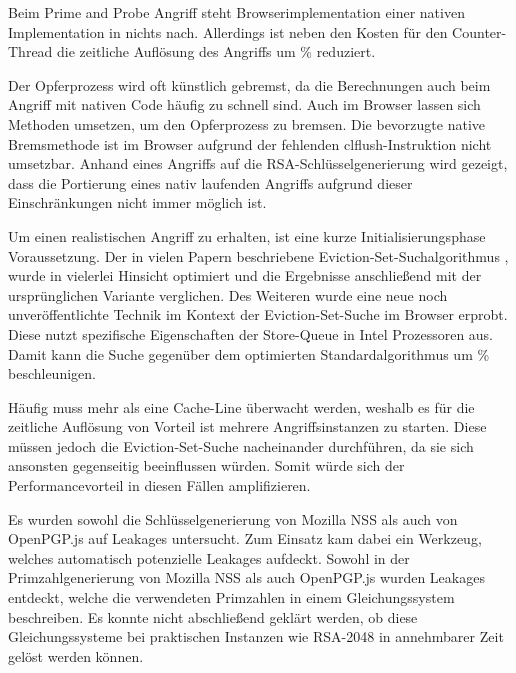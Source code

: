 Beim Prime and Probe Angriff steht Browserimplementation einer nativen Implementation in nichts nach. Allerdings ist neben den Kosten für den Counter-Thread die zeitliche Auflösung des Angriffs um  \% reduziert.

Der Opferprozess wird oft künstlich gebremst, da die Berechnungen auch beim Angriff mit nativen Code häufig zu schnell sind.
Auch im Browser lassen sich Methoden umsetzen, um den Opferprozess zu bremsen. 
Die bevorzugte native Bremsmethode ist im Browser aufgrund der fehlenden clflush-Instruktion nicht umsetzbar.
Anhand eines Angriffs auf die RSA-Schlüsselgenerierung wird gezeigt, dass die Portierung eines nativ laufenden Angriffs aufgrund dieser Einschränkungen nicht immer möglich ist.

\par\medskip

Um einen realistischen Angriff zu erhalten, ist eine kurze Initialisierungsphase Voraussetzung.
Der in vielen Papern beschriebene Eviction-Set-Suchalgorithmus \cite{PrimeAndAbort, LiuPrimeAndProbe, DriveByPaper}, wurde in vielerlei Hinsicht optimiert und die Ergebnisse anschließend mit der ursprünglichen Variante verglichen. 
Des Weiteren wurde eine neue noch unveröffentlichte Technik im Kontext der Eviction-Set-Suche im Browser erprobt.
Diese nutzt spezifische Eigenschaften der Store-Queue in Intel Prozessoren aus.
Damit kann die Suche gegenüber dem optimierten Standardalgorithmus um  \% beschleunigen.

Häufig muss mehr als eine Cache-Line überwacht werden, weshalb es für die zeitliche Auflösung von Vorteil ist mehrere Angriffsinstanzen zu starten.
Diese müssen jedoch die Eviction-Set-Suche nacheinander durchführen, da sie sich ansonsten gegenseitig beeinflussen würden.
Somit würde sich der Performancevorteil in diesen Fällen amplifizieren.

\par\medskip

Es wurden sowohl die Schlüsselgenerierung von Mozilla NSS als auch von OpenPGP.js auf Leakages untersucht. 
Zum Einsatz kam dabei ein Werkzeug, welches automatisch potenzielle Leakages aufdeckt.
Sowohl in der Primzahlgenerierung von Mozilla NSS als auch OpenPGP.js wurden Leakages entdeckt, welche die verwendeten Primzahlen in einem Gleichungssystem beschreiben.
Es konnte nicht abschließend geklärt werden, ob diese Gleichungssysteme bei praktischen Instanzen wie RSA-2048 in annehmbarer Zeit gelöst werden können.

